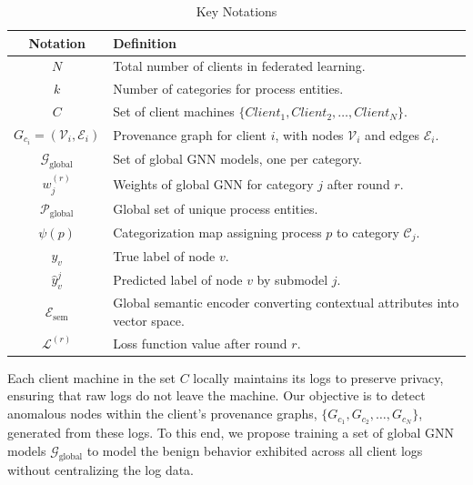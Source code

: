   \begin{table}[!t]
    \centering
    \scriptsize
    \caption{Key Notations}
    \label{tab:keynotations}
    \begin{tabular}{|c|p{6cm}|}
    \hline
    \textbf{Notation} & \textbf{Definition} \\ \hline
    \( N \) & Total number of clients in federated learning. \\ \hline
    \( k \) & Number of categories for process entities. \\ \hline
    \( C \) & Set of client machines \(\{Client_1, Client_2, \ldots, Client_N\}\). \\ \hline
    \( G_{c_i} = (\mathcal{V}_i, \mathcal{E}_i) \) & Provenance graph for client \( i \), with nodes \( \mathcal{V}_i \) and edges \( \mathcal{E}_i \). \\ \hline
    \( \mathcal{G}_{\text{global}} \) & Set of global GNN models, one per category. \\ \hline
    \( w_j^{(r)} \) & Weights of global GNN for category \( j \) after round \( r \). \\ \hline
    \( \mathcal{P}_{\text{global}} \) & Global set of unique process entities. \\ \hline
    \( \psi(p) \) & Categorization map assigning process \( p \) to category \( \mathcal{C}_j \). \\ \hline
    \( y_v \) & True label of node \( v \). \\ \hline
    \( \hat{y}_v^j \) & Predicted label of node \( v \) by submodel \( j \). \\ \hline
    \( \mathcal{E}_{\text{sem}} \) & Global semantic encoder converting contextual attributes into vector space. \\ \hline
    \( \mathcal{L}^{(r)} \) & Loss function value after round \( r \). \\ \hline
    \end{tabular}
  \end{table}

Each client machine in the set \( C \) locally maintains its logs to preserve privacy, ensuring that raw logs do not leave the machine. Our objective is to detect anomalous nodes within the client's provenance graphs, \( \{G_{c_1}, G_{c_2}, \ldots, G_{c_N}\} \), generated from these logs. To this end, we propose training a set of global GNN models \( \mathcal{G}_{\text{global}} \) to model the benign behavior exhibited across all client logs without centralizing the log data.

